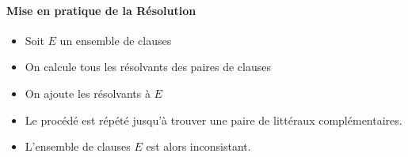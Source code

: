 \documentclass[10pt,a4paper]{article}
\begin{document}
	\paragraph{Mise en pratique de la Résolution}
		\begin{itemize}
			\item Soit $E$ un ensemble de clauses
			\item On calcule tous les résolvants des paires de clauses
			\item On ajoute les résolvants à $E$
			\item Le procédé est répété jusqu’à trouver une paire de littéraux complémentaires.
			\item L'ensemble de clauses $E$ est alors inconsistant.
		\end{itemize}
\end{document}
